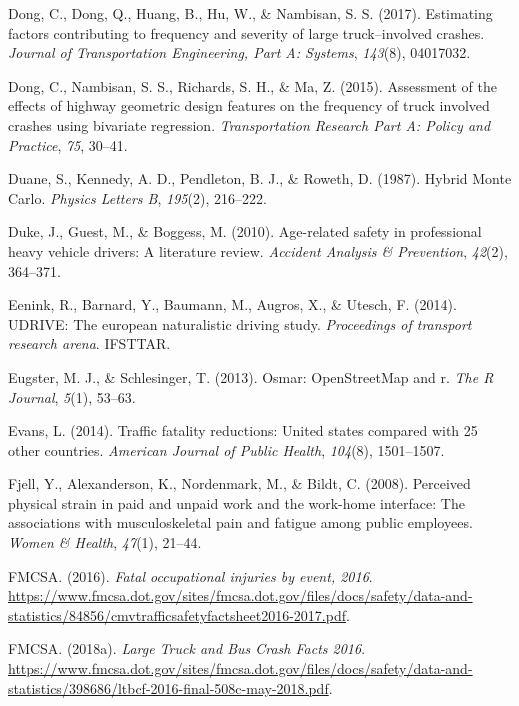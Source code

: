 \documentclass[12pt]{book}
\numberwithin{equation}{chapter}
\begin{document}
\leavevmode\hypertarget{ref-dong2017estimating}{}%
Dong, C., Dong, Q., Huang, B., Hu, W., \& Nambisan, S. S. (2017). Estimating factors contributing to frequency and severity of large truck--involved crashes. \emph{Journal of Transportation Engineering, Part A: Systems}, \emph{143}(8), 04017032.

\leavevmode\hypertarget{ref-dong2015assessment}{}%
Dong, C., Nambisan, S. S., Richards, S. H., \& Ma, Z. (2015). Assessment of the effects of highway geometric design features on the frequency of truck involved crashes using bivariate regression. \emph{Transportation Research Part A: Policy and Practice}, \emph{75}, 30--41.

\leavevmode\hypertarget{ref-duane1987hybrid}{}%
Duane, S., Kennedy, A. D., Pendleton, B. J., \& Roweth, D. (1987). Hybrid Monte Carlo. \emph{Physics Letters B}, \emph{195}(2), 216--222.

\leavevmode\hypertarget{ref-duke2010age}{}%
Duke, J., Guest, M., \& Boggess, M. (2010). Age-related safety in professional heavy vehicle drivers: A literature review. \emph{Accident Analysis \& Prevention}, \emph{42}(2), 364--371.

\leavevmode\hypertarget{ref-eenink2014udrive}{}%
Eenink, R., Barnard, Y., Baumann, M., Augros, X., \& Utesch, F. (2014). UDRIVE: The european naturalistic driving study. \emph{Proceedings of transport research arena}. IFSTTAR.

\leavevmode\hypertarget{ref-eugster2013osmar}{}%
Eugster, M. J., \& Schlesinger, T. (2013). Osmar: OpenStreetMap and r. \emph{The R Journal}, \emph{5}(1), 53--63.

\leavevmode\hypertarget{ref-evans2014traffic}{}%
Evans, L. (2014). Traffic fatality reductions: United states compared with 25 other countries. \emph{American Journal of Public Health}, \emph{104}(8), 1501--1507.

\leavevmode\hypertarget{ref-fjell2008perceived}{}%
Fjell, Y., Alexanderson, K., Nordenmark, M., \& Bildt, C. (2008). Perceived physical strain in paid and unpaid work and the work-home interface: The associations with musculoskeletal pain and fatigue among public employees. \emph{Women \& Health}, \emph{47}(1), 21--44.

\leavevmode\hypertarget{ref-fmcsafacts2016}{}%
FMCSA. (2016). \emph{Fatal occupational injuries by event, 2016}. \url{https://www.fmcsa.dot.gov/sites/fmcsa.dot.gov/files/docs/safety/data-and-statistics/84856/cmvtrafficsafetyfactsheet2016-2017.pdf}.

\leavevmode\hypertarget{ref-fmcsareport2016}{}%
FMCSA. (2018a). \emph{Large Truck and Bus Crash Facts 2016}. \url{https://www.fmcsa.dot.gov/sites/fmcsa.dot.gov/files/docs/safety/data-and-statistics/398686/ltbcf-2016-final-508c-may-2018.pdf}.
\end{document}
